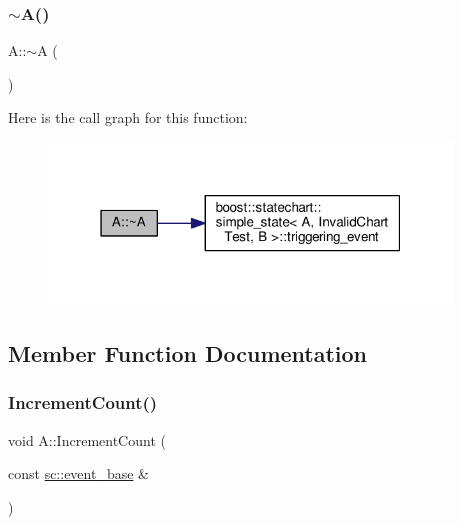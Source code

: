 \subsubsection{\texorpdfstring{$\sim$\+A()}{~A()}}
{\footnotesize\ttfamily A\+::$\sim$A (\begin{DoxyParamCaption}{ }\end{DoxyParamCaption})\hspace{0.3cm}{\ttfamily [inline]}}

Here is the call graph for this function\+:
\nopagebreak
\begin{figure}[H]
\begin{center}
\leavevmode
\includegraphics[width=304pt]{struct_a_a8d74412b1ff05d7493b4c546795bf405_cgraph}
\end{center}
\end{figure}


\subsection{Member Function Documentation}
\mbox{\label{struct_a_a7811ed8883449fde0d5f59bd2ebf3de5}} 
\subsubsection{\texorpdfstring{Increment\+Count()}{IncrementCount()}\hspace{0.1cm}{\footnotesize\ttfamily [1/3]}}
{\footnotesize\ttfamily void A\+::\+Increment\+Count (\begin{DoxyParamCaption}\item[{const \mbox{\hyperlink{classboost_1_1statechart_1_1event__base}{sc\+::event\+\_\+base}} \&}]{ }\end{DoxyParamCaption})\hspace{0.3cm}{\ttfamily [inline]}}

\mbox{\label{struct_a_afb9a418cf38492b6c1c50dbe1df1e741}} 
